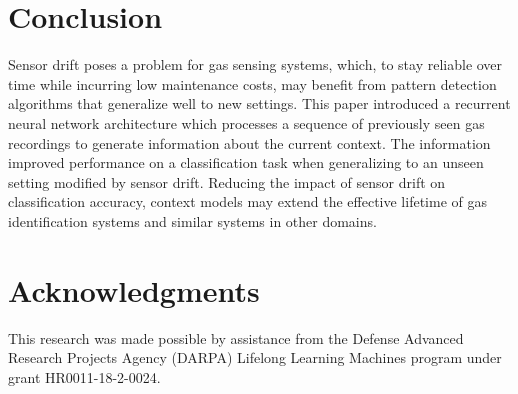\documentclass[onecolumn,pre,floats,aps,amsmath,amssymb,superscriptaddress]{revtex4-1}
\begin{document}
\section{Conclusion}
Sensor drift poses a problem for gas sensing systems, which, to stay reliable over time while incurring low maintenance costs, may benefit from pattern detection algorithms that generalize well to new settings. This paper introduced a recurrent neural network architecture which processes a sequence of previously seen gas recordings to generate information about the current context. The information improved performance on a classification task when generalizing to an unseen setting modified by sensor drift. Reducing the impact of sensor drift on classification accuracy, context models may extend the effective lifetime of gas identification systems and similar systems in other domains.

\section{Acknowledgments}
This research was made possible by assistance from the Defense Advanced Research Projects Agency (DARPA) Lifelong Learning Machines program under grant HR0011-18-2-0024.

%

\end{document}
